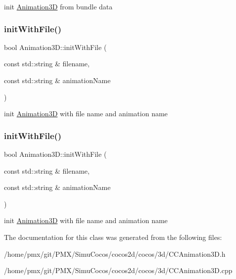 init \hyperlink{classAnimation3D}{Animation3D} from bundle data \mbox{\label{classAnimation3D_af422cbc2c0bf707c2f048299a7f6bd6d}} 
\subsubsection{\texorpdfstring{init\+With\+File()}{initWithFile()}\hspace{0.1cm}{\footnotesize\ttfamily [1/2]}}
{\footnotesize\ttfamily bool Animation3\+D\+::init\+With\+File (\begin{DoxyParamCaption}\item[{const std\+::string \&}]{filename,  }\item[{const std\+::string \&}]{animation\+Name }\end{DoxyParamCaption})}

init \hyperlink{classAnimation3D}{Animation3D} with file name and animation name \mbox{\label{classAnimation3D_af422cbc2c0bf707c2f048299a7f6bd6d}} 
\subsubsection{\texorpdfstring{init\+With\+File()}{initWithFile()}\hspace{0.1cm}{\footnotesize\ttfamily [2/2]}}
{\footnotesize\ttfamily bool Animation3\+D\+::init\+With\+File (\begin{DoxyParamCaption}\item[{const std\+::string \&}]{filename,  }\item[{const std\+::string \&}]{animation\+Name }\end{DoxyParamCaption})}

init \hyperlink{classAnimation3D}{Animation3D} with file name and animation name 

The documentation for this class was generated from the following files\+:\begin{DoxyCompactItemize}
\item 
/home/pmx/git/\+P\+M\+X/\+Simu\+Cocos/cocos2d/cocos/3d/C\+C\+Animation3\+D.\+h\item 
/home/pmx/git/\+P\+M\+X/\+Simu\+Cocos/cocos2d/cocos/3d/C\+C\+Animation3\+D.\+cpp\end{DoxyCompactItemize}
